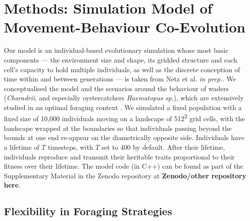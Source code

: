 \documentclass[11pt]{article}
\begin{document}
\section{Methods: Simulation Model of Movement-Behaviour Co-Evolution}

Our model is an individual-based evolutionary simulation whose most basic components --- the environment size and shape, its gridded structure and each cell's capacity to hold multiple individuals, as well as the discrete conception of time within and between generations --- is taken from Netz et al. \textit{in prep.}.
We conceptualised the model and the scenarios around the behaviour of waders (\textit{Charadrii}, and especially oystercatchers \textit{Haematopus sp.}), which are extensively studied in an optimal foraging context \citep[e.g. ][]{vahl2005, vahl2005a, vahl2005b, ENS1990219}.
We simulated a fixed population with a fixed size of 10,000 individuals moving on a landscape of 512\textsuperscript{2} grid cells, with the landscape wrapped at the boundaries so that individuals passing beyond the bounds at one end re-appear on the diametrically opposite side.
Individuals have a lifetime of $T$ timesteps, with $T$ set to 400 by default.
After their lifetime, individuals reproduce and transmit their heritable traits proportional to their fitness over their lifetime.
The model code (in C++) can be found as part of the Supplementary Material in the Zenodo repository at \textbf{Zenodo/other repository here}.

\subsection{Flexibility in Foraging Strategies}
\end{document}
